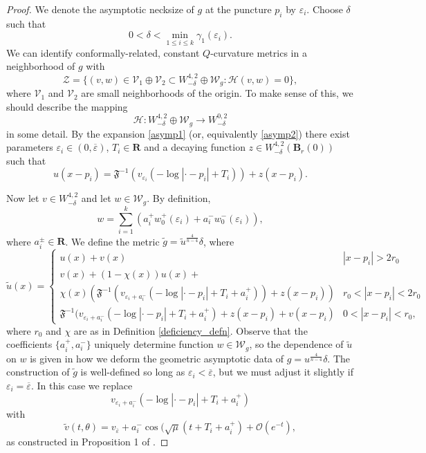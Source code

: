 \documentclass[reqno,11pt]{amsart}
\theoremstyle{tttheorem}
\newcommand{\R}{\mathbf{R}}
\newcommand{\B}{\mathbf{B}}
\begin{document}
\begin{proof}
We denote the 
asymptotic necksize of $g$ at the puncture $p_i$ by $\varepsilon_i$. 
Choose $\delta$ such that 
$$0 < \delta < \min_{1 \leq i \leq k} \gamma_1(\varepsilon_i).$$ 
We can identify conformally-related, constant $Q$-curvature metrics in a 
neighborhood of $g$ with 
\begin{equation} \label{deformation_space1}
\mathcal{Z} = \{ (v,w) \in \mathcal{V}_1 \oplus \mathcal{V}_2 \subset 
W^{4,2}_{-\delta} \oplus \mathcal{W}_g : \mathcal{H}(v,w) = 0 \} , 
\end{equation} 
where $\mathcal{V}_1$ and $\mathcal{V}_2$ are small neighborhoods of the origin.  To make sense of this, we should describe the mapping 
\begin{equation} \label{deformation_space2} 
\mathcal{H}: W^{4,2}_{-\delta} \oplus \mathcal{W}_g \rightarrow W^{0,2}_{-\delta}
\end{equation} 
in some detail. By the expansion \eqref{asymp1} (or, equivalently \eqref{asymp2})  
there exist parameters $\varepsilon_i \in (0, \overline{\varepsilon})$, 
$T_i \in \R$ and a decaying function $z \in W^{4,2}_{-\delta} (\B_r(0))$ such that  
$$u(x-p_i) = \mathfrak{F}^{-1} \left ( v_{\varepsilon_i} (-\log |\cdot -p_i| + T_i) 
\right ) + z(x-p_i) . $$

Now let $v \in W^{4,2}_{-\delta}$ and let $w \in \mathcal{W}_g$. By 
definition, 
$$w = \sum_{i=1}^k (a_i^+ w_0^+(\varepsilon_i) + a_i^- w_0^-(\varepsilon_i)),$$
where $a_i^\pm \in \R$. We define the metric $\widetilde g = 
\widetilde u^{\frac{4}{n-4}} \delta$, 
where 
\begin{equation} \label{deformation_space3} 
\widetilde u(x) = \left \{ \begin{array}{cc} u(x) + v(x) & |x-p_i|> 2r_0 \\ 
v(x) + (1-\chi(x)) u(x) + & \\ 
\chi(x)(\mathfrak{F}^{-1}(v_{\varepsilon_i+a_i^-}
(-\log|\cdot - p_i| + T_i + a_i^+)) + z(x-p_i)) & r_0 < |x-p_i| < 2r_0 \\ 
\mathfrak{F}^{-1} (v_{\varepsilon_i + a_i^-} (-\log |\cdot - p_i| + T_i +a_i^+) +z(x-p_i) +v(x-p_i) & 
0 < |x-p_i|< r_0 ,\end{array} \right. \end{equation}
where $r_0$ and $\chi$ are as in Definition \ref{deficiency_defn}. Observe that 
the coefficients $\{ a_i^+, a_i^-\}$ uniquely determine function $w\in \mathcal{W}_g$, 
so the dependence of $\widetilde{u}$ on $w$ is given in how we 
deform the geometric asymptotic data of $g = u^{\frac{4}{n-4}} \delta$. The construction 
of $\widetilde {g}$ is well-defined so long as $\varepsilon_i < \overline{\varepsilon}$, 
but we must adjust it slightly if $\varepsilon_i = \overline{\varepsilon}$. In 
this case we replace 
$$v_{\varepsilon_i + a_i^-} (-\log|\cdot - p_i| + T_i + a_i^+)$$
with 
$$\widetilde{v} (t,\theta) = v_{\overline{\varepsilon}} + 
a_i^- \cos(\sqrt{\mu} (t+T_i + a_i^+) + \mathcal{O}(e^{-t}) ,$$
as constructed in Proposition 1 of \cite{BR}. 


\end{proof}
\end{document}
